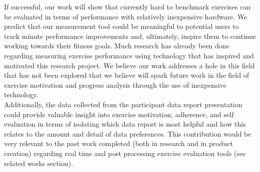 If successful, our work will show that currently hard to benchmark exercises can be evaluated in terms of performance with relatively inexpensive hardware.  We predict that our measurement tool could be meaningful to potential users to track minute performance improvements and, ultimately, inspire them to continue working towards their fitness goals.  Much research has already been done regarding measuring exercise performance using technology that has inspired and motivated this research project.  We believe our work addresses a hole in this field that has not been explored that we believe will spark future work in the field of exercise motivation and progress analysis through the use of inexpensive technology.\\
Additionally, the data collected from the participant data report presentation could provide valuable insight into exercise motivation, adherence, and self evaluation in terms of isolating which data report is most helpful and how this relates to the amount and detail of data preferences.  This contribution would be very relevant to the past work completed (both in research and in product creation) regarding real time and post processing exercise evaluation tools (see related works section).